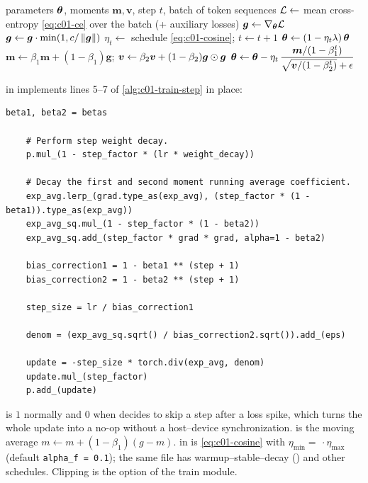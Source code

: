 \begin{algorithm}[t]
\caption{One training step with AdamW, warmup--cosine schedule and gradient clipping.}\label{alg:c01-train-step}
\begin{algorithmic}[1]
\Require parameters $\bm{\theta}$, moments $\bm{m}, \bm{v}$, step $t$, batch of token sequences
\State $\mathcal{L} \gets$ mean cross-entropy \eqref{eq:c01-ce} over the batch (+ auxiliary losses)
\State $\bm{g} \gets \nabla_{\bm{\theta}}\mathcal{L}$ 
\State $\bm{g} \gets \bm{g}\cdot\min(1, c/\left\lVert \bm{g}\right\rVert)$ 
\State $\eta_t \gets$ schedule \eqref{eq:c01-cosine}; $t \gets t + 1$
\State $\bm{\theta} \gets (1 - \eta_t\lambda)\,\bm{\theta}$ 
\State $\bm{m} \gets \beta_1\bm{m} + (1-\beta_1)\bm{g}$; \quad $\bm{v} \gets \beta_2\bm{v} + (1-\beta_2)\bm{g}\odot\bm{g}$
\State $\bm{\theta} \gets \bm{\theta} - \eta_t\,\dfrac{\bm{m}/(1-\beta_1^t)}{\sqrt{\bm{v}/(1-\beta_2^t)} + \epsilon}$
\end{algorithmic}
\end{algorithm}

\begin{implnote}[title={In the code: AdamW and the cosine schedule in OLMo-core}]
 in 
implements lines 5--7 of \cref{alg:c01-train-step} in place:
\begin{lstlisting}[caption={Excerpt from \texttt{repos/\allowbreak allenai\_\_OLMo-core/\allowbreak src/\allowbreak olmo\_core/\allowbreak optim/\allowbreak adamw.py}},label={lst:c01-olmo-adamw}]
    beta1, beta2 = betas

    # Perform step weight decay.
    p.mul_(1 - step_factor * (lr * weight_decay))

    # Decay the first and second moment running average coefficient.
    exp_avg.lerp_(grad.type_as(exp_avg), (step_factor * (1 - beta1)).type_as(exp_avg))
    exp_avg_sq.mul_(1 - step_factor * (1 - beta2))
    exp_avg_sq.add_(step_factor * grad * grad, alpha=1 - beta2)

    bias_correction1 = 1 - beta1 ** (step + 1)
    bias_correction2 = 1 - beta2 ** (step + 1)

    step_size = lr / bias_correction1

    denom = (exp_avg_sq.sqrt() / bias_correction2.sqrt()).add_(eps)

    update = -step_size * torch.div(exp_avg, denom)
    update.mul_(step_factor)
    p.add_(update)
\end{lstlisting}
 is $1$ normally and $0$ when  decides to skip a step
after a loss spike, which turns the whole update into a no-op without a host--device
synchronization.  is the moving average
$m \gets m + (1-\beta_1)(g - m)$.  in
 is
\eqref{eq:c01-cosine} with $\eta_{\min} = $  $\cdot\,\eta_{\max}$ (default
\texttt{alpha\_f = 0.1}); the same file has warmup--stable--decay () and other
schedules. Clipping is the  option of the train module.
\end{implnote}

